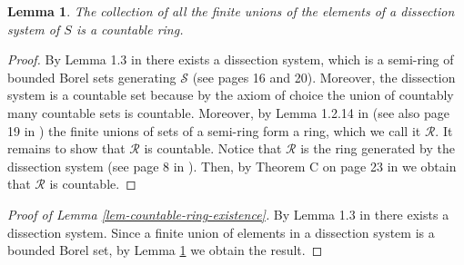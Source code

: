 \documentclass{article}
\theoremstyle{plain}
\newtheorem{lemma}[theorem]{Lemma}
\theoremstyle{remark}
\begin{document}
\begin{lemma}\label{lem-dissection}
	The collection of all the finite unions of the elements of a dissection system of $S$ is a countable ring.
\end{lemma}
\begin{proof}
	By Lemma 1.3 in \cite{Kallenberg2} there exists a dissection system, which is a semi-ring of bounded Borel sets generating $\mathcal{S}$ (see \cite{Kallenberg2} pages 16 and 20). Moreover, the dissection system is a countable set because by the axiom of choice the union of countably many countable sets is countable. Moreover, by Lemma 1.2.14 in \cite{Bogachev} (see also page 19 in \cite{Kallenberg2}) the finite unions of sets of a semi-ring form a ring, which we call it $\mathcal{R}$. It remains to show that $\mathcal{R}$ is countable. Notice that $\mathcal{R}$ is the ring generated by the dissection system (see page 8 in \cite{Bogachev}). Then, by Theorem C on page 23 in \cite{Halmos} we obtain that $\mathcal{R}$ is countable.
\end{proof}


\begin{proof}[Proof of Lemma \ref{lem-countable-ring-existence}]
	By Lemma 1.3 in \cite{Kallenberg2} there exists a dissection system. Since a finite union of elements in a dissection system is a bounded Borel set, by Lemma \ref{lem-dissection} we obtain the result.
\end{proof}
\end{document}
